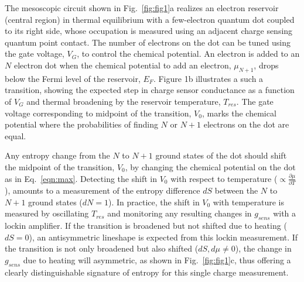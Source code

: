 \documentclass[preprint,showpacs,preprintnumbers,amsmath,amssymb,pra,aps,superscriptaddress]{revtex4-1}
\begin{document}
The mesoscopic circuit shown in Fig.~\ref{fig:fig1}a realizes an electron reservoir (central region) in thermal equilibrium with a few-electron quantum dot coupled to its right side, whose occupation is measured using an adjacent charge sensing quantum point contact\cite{Staring2007, Frolov2009, Thierschmann2015}. The number of electrons on the dot can be tuned using the gate voltage, $V_G$, to control the chemical potential.  An electron is added to an $N$ electron dot when the chemical potential to add an electron, $\mu_{N+1}$, drops below the Fermi level of the reservoir, $E_F$.  Figure 1b illustrates a such a transition, showing the expected step in charge sensor conductance as a function of $V_G$ and thermal broadening by the reservoir temperature, $T_{res}$. The gate voltage corresponding to midpoint of the transition, $V_0$, marks the chemical potential where the probabilities of finding $N$ or $N+1$ electrons on the dot are equal.

Any entropy change from the $N$ to $N+1$ ground states of the dot should shift the midpoint of the transition, $V_0$, by changing the chemical potential on the dot as in Eq.~\ref{eqn:max}.  Detecting the shift in $V_0$ with respect to temperature (${\propto}\frac{\partial \mu}{\partial T}$), amounts to a measurement of the entropy difference $dS$ between the $N$ to $N+1$ ground states ($dN=1$).  In practice, the shift in $V_0$ with temperature is measured by oscillating $T_{res}$ and monitoring any resulting changes in $g_{sens}$ with a lockin amplifier.  If the transition is broadened but not shifted due to heating ($dS=0$), an antisymmetric lineshape is expected from this lockin measurement.  If the transition is not only broadened but also shifted ($dS,d\mu\neq0$), the change in $g_{sens}$ due to heating will asymmetric, as shown in Fig.~\ref{fig:fig1}c, thus offering a clearly distinguishable signature of entropy for this single charge measurement.
\end{document}
